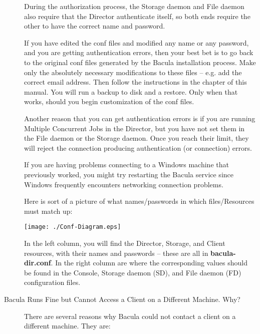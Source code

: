\begin{description}
   During the authorization process, the Storage daemon  and File daemon also
   require that the Director authenticate  itself, so both ends require the other
   to have the correct  name and password.  

   If you have edited the conf files and modified any name or  any password, and
   you are getting authentication errors,  then your best bet is to go back to
   the  original conf files generated by the Bacula installation  process. Make
   only the absolutely necessary modifications  to these files -- e.g. add the
   correct email address. Then  follow the instructions in the 
    chapter of this manual. You
   will run  a backup to disk and a restore. Only when that works, should you
   begin customization of the conf files.  

   Another reason that you can get authentication errors is  if you are running
   Multiple Concurrent Jobs in the Director,  but you have not set them in the
   File daemon or the Storage  daemon. Once you reach their limit, they will
   reject the  connection producing authentication (or connection) errors.

   If you are having problems connecting to a Windows machine that previously
   worked, you might try restarting the Bacula service since Windows frequently 
   encounters networking connection problems.

   Here is sort of a picture of what names/passwords in which  files/Resources
   must match up:  

   \texttt{[image: ./Conf-Diagram.eps]}  

   In the left column, you will find the Director, Storage, and  Client
   resources, with their names and passwords -- these  are all in {\bf
   bacula-dir.conf}. In the right column  are where the corresponding values
   should be found in the  Console, Storage daemon (SD), and File daemon (FD)
   configuration  files.  

\label{AccessProblems}

\item [Bacula Runs Fine but Cannot Access a Client on a Different Machine.
   Why? ]
   There are several reasons why Bacula could not contact a client  on a
   different machine. They are:  


\end{description}
